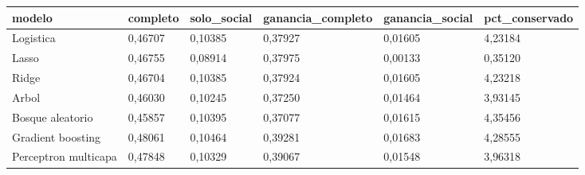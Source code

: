 \begin{tabular}{llllll}
\toprule
modelo & completo & solo\_social & ganancia\_completo & ganancia\_social & pct\_conservado \\
\midrule
Logistica & 0{,}46707 & 0{,}10385 & 0{,}37927 & 0{,}01605 & 4{,}23184 \\
Lasso & 0{,}46755 & 0{,}08914 & 0{,}37975 & 0{,}00133 & 0{,}35120 \\
Ridge & 0{,}46704 & 0{,}10385 & 0{,}37924 & 0{,}01605 & 4{,}23218 \\
Arbol & 0{,}46030 & 0{,}10245 & 0{,}37250 & 0{,}01464 & 3{,}93145 \\
Bosque aleatorio & 0{,}45857 & 0{,}10395 & 0{,}37077 & 0{,}01615 & 4{,}35456 \\
Gradient boosting & 0{,}48061 & 0{,}10464 & 0{,}39281 & 0{,}01683 & 4{,}28555 \\
Perceptron multicapa & 0{,}47848 & 0{,}10329 & 0{,}39067 & 0{,}01548 & 3{,}96318 \\
\bottomrule
\end{tabular}
